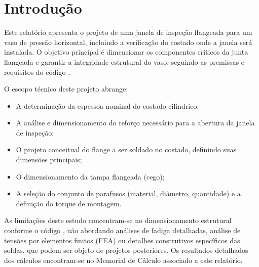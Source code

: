 \chapter{Introdução}

Este relatório apresenta o projeto de uma janela de inspeção flangeada para um vaso de pressão horizontal, incluindo a verificação do costado onde a janela será instalada. O objetivo principal é dimensionar os componentes críticos da junta flangeada e garantir a integridade estrutural do vaso, seguindo as premissas e requisitos do código \textcite{ASME_VIII_1_2017}.

O escopo técnico deste projeto abrange:
\begin{itemize}
    \item A determinação da espessoa nominal do costado cilíndrico;
    \item A análise e dimensionamento do reforço necessário para a abertura da janela de inspeção;
    \item O projeto conceitual do flange a ser soldado no costado, definindo suas dimensões principais;
    \item O dimensionamento da tampa flangeada (cego);
    \item A seleção do conjunto de parafusos (material, diâmetro, quantidade) e a definição do torque de montagem.
\end{itemize}
As limitações deste estudo concentram-se no dimensionamento estrutural conforme o código \textcite{ASME_VIII_1_2017}, não abordando análises de fadiga detalhadas, análise de tensões por elementos finitos (FEA) ou detalhes construtivos específicos das soldas, que podem ser objeto de projetos posteriores. Os resultados detalhados dos cálculos encontram-se no Memorial de Cálculo associado a este relatório.